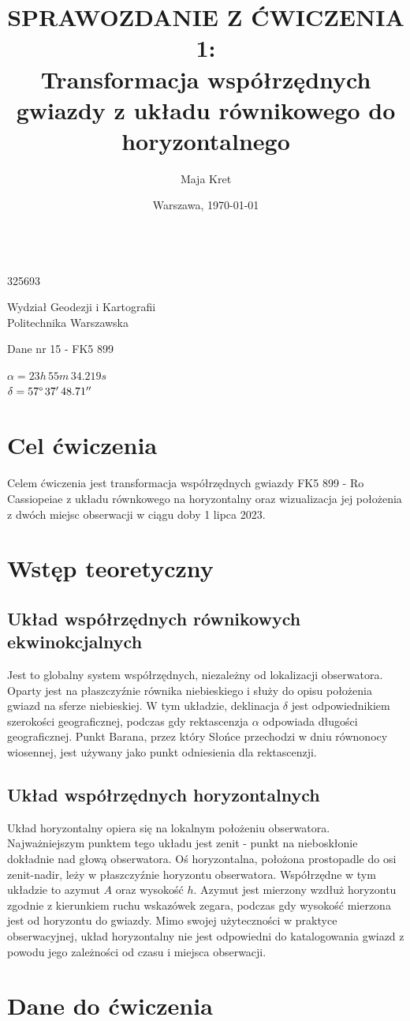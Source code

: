 \documentclass[fleqn,10pt,a4paper]{article}
\title{\textbf{SPRAWOZDANIE Z ĆWICZENIA 1:}\\ Transformacja współrzędnych gwiazdy z układu równikowego do horyzontalnego}
\author{Maja Kret}
\date{Warszawa, \today}
\makeatletter
\renewcommand{\maketitle}{%
  \begin{titlepage}
    \begin{center}
      \vspace*{2cm}
      {\huge \@title \par}
      \vspace{1.5cm}
      {\large \@author \\ 325693 \par}
      {\large Wydział Geodezji i Kartografii\\ Politechnika Warszawska \par}
      \vspace{1.5cm}
      {\large Dane nr 15 - FK5 899 \par}
      {\large $\alpha = 23h \, 55m \,34.219s$ \\ $\delta = 57 \degree \, 37' \, 48.71''$\par}
      \vspace{9cm}
      {\large \@date \par}
      \vspace{1.5cm}
    \end{center}
  \end{titlepage}
}
\makeatother
\begin{document}
 
\pagestyle{fancy}
\fancyhf{}
\rfoot{\thepage}
\renewcommand{\headrulewidth}{0pt}
\maketitle
\rhead{~}

\tableofcontents
\newpage

\section{Cel ćwiczenia}
Celem ćwiczenia jest transformacja współrzędnych gwiazdy FK5 899 - Ro Cassiopeiae z układu równkowego na horyzontalny
oraz wizualizacja jej położenia z dwóch miejsc obserwacji w ciągu doby 1 lipca 2023.

\section{Wstęp teoretyczny}
\subsection{Układ współrzędnych równikowych ekwinokcjalnych}
Jest to globalny system współrzędnych, niezależny od lokalizacji obserwatora. 
Oparty jest na płaszczyźnie równika niebieskiego i służy do opisu położenia gwiazd na sferze niebieskiej.
W tym układzie, deklinacja $\delta$ jest odpowiednikiem szerokości geograficznej, podczas gdy rektascenzja $\alpha$ odpowiada 
długości geograficznej. Punkt Barana, przez który Słońce przechodzi w dniu równonocy wiosennej, jest używany jako punkt 
odniesienia dla rektascenzji.
\subsection{Układ współrzędnych horyzontalnych}
Układ horyzontalny opiera się na lokalnym położeniu obserwatora. 
Najważniejszym punktem tego układu jest zenit - punkt na nieboskłonie dokładnie nad głową obserwatora. 
Oś horyzontalna, położona prostopadle do osi zenit-nadir, leży w płaszczyźnie horyzontu obserwatora. 
Współrzędne w tym układzie to azymut $A$ oraz wysokość $h$. Azymut jest mierzony wzdłuż horyzontu zgodnie z kierunkiem ruchu 
wskazówek zegara, podczas gdy wysokość mierzona jest od horyzontu do gwiazdy. 
Mimo swojej użyteczności w praktyce obserwacyjnej, układ horyzontalny nie jest odpowiedni do katalogowania gwiazd 
z powodu jego zależności od czasu i miejsca obserwacji.

\section{Dane do ćwiczenia}
\end{document}
